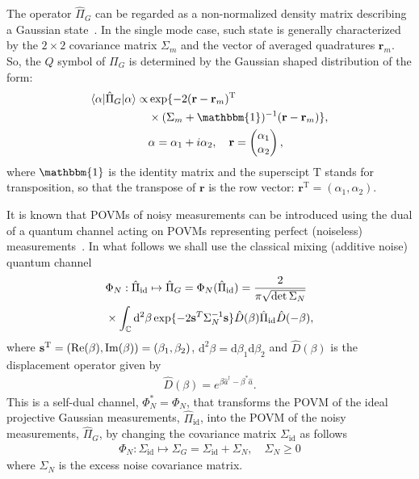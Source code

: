 \documentclass[%
reprint,
superscriptaddress,
 amsmath,amssymb,amsfonts,
 aps,
 pra,
 longbibliography
]{revtex4-2}
\newcommand{\ket}[1]{\ensuremath{|{#1}\rangle}}
\newcommand{\bra}[1]{\ensuremath{\langle{#1}|}}
\newcommand{\cnj}[1]{{#1}^{\ast}}
\newcommand{\hcnj}[1]{{#1}^{\dagger}}
\newcommand{\tcnj}[1]{{#1}^{\mathrm{T}}}
\renewcommand{\Re}{\mathop{\rm Re}\nolimits}
\renewcommand{\Im}{\mathop{\rm Im}\nolimits}
\newcommand{\vc}[1]{\mathbf{#1}}
\newcommand{\ind}[1]{\mathrm{#1}}
\newcommand{\dd}{\mathrm{d}}
\begin{document}
The operator $\hat{\Pi}_G$ can be regarded as a non-normalized density
matrix describing a Gaussian state~\cite{Serafini:bk:2023}.
In the single mode case,
such state is generally
characterized by the $2\times 2$ covariance matrix
$\Sigma_m$ and the vector of averaged quadratures
$\vc{r}_m$.
So, the $Q$ symbol of $\Pi_G$
is determined by
the Gaussian shaped distribution of the form:
\begin{align}
  \label{eq:PG-Q-symbol}
    \bra{\alpha}\hat{\Pi}_G\ket{\alpha}
    \propto
    &
    \exp\{-2 (\vc{r}-\vc{r}_m)^{\ind{T}}
    \notag
    \\
&
  \times  (\Sigma_m+\mathbbm{1})^{-1}(\vc{r}-\vc{r}_m)\},
  \\
    &
      \alpha=\alpha_1+i \alpha_2,
      \quad \vc{r}=
      \begin{pmatrix}
        \alpha_1\\ \alpha_2
      \end{pmatrix},
\end{align}
where
$\mathbbm{1}$ is the identity matrix
and the superscipt $\ind{T}$ stands for transposition,
so that the transpose of $\vc{r}$ is the row vector:
$\tcnj{\vc{r}}=(\alpha_1,\alpha_2)$.

It is known that POVMs of noisy measurements can be introduced
using the dual of a quantum channel acting on
POVMs representing perfect (noiseless)
measurements~\cite{Serafini:bk:2023}.
In what follows we shall use
the classical mixing (additive noise) quantum channel
\begin{align}
  \label{eq:Phi_N}
  &
    \Phi_N:
    \hat{\Pi}_{\ind{id}}\mapsto
    \hat{\Pi}_G= \Phi_N(\hat{\Pi}_{\ind{id}})=
    \frac{2}{\pi\sqrt{\det\Sigma_N}}
    \notag
  \\
  &
    \times \int_{\mathbb{C}}\dd^2\beta
    \exp\{-2 \vc{s}^T\Sigma_N^{-1}\vc{s}\}
    \hat{D}(\beta)\hat{\Pi}_{\ind{id}}\hat{D}(-\beta),
\end{align}
where
$\tcnj{\vc{s}}=(\Re(\beta), \Im(\beta))=(\beta_1,\beta_2)$,
$\dd^2\beta=\dd \beta_1\dd \beta_2$
and $\hat{D}(\beta)$ is the displacement operator given by
\begin{align}
    \label{eq:D-def}
\hat{D}(\beta) =
e^{\beta\hcnj{\hat{a}}-\beta^*\hat{a}}.
\end{align}
This is a self-dual channel,
$\cnj{\Phi}_N=\Phi_N$,
that transforms the POVM of the ideal projective Gaussian measurements,
$\hat{\Pi}_{\ind{id}}$,
into the POVM of the noisy measurements,
$\hat{\Pi}_{G}$, 
by changing the covariance matrix $\Sigma_{\ind{id}}$
as follows
\begin{align}
  \label{eq:Sigma_N}
  \Phi_N:
  \Sigma_{\ind{id}}\mapsto
  \Sigma_G=\Sigma_{\ind{id}}+\Sigma_N,
  \quad \Sigma_N\ge 0
\end{align}
where $\Sigma_N$ is
the excess noise covariance matrix.
\end{document}
